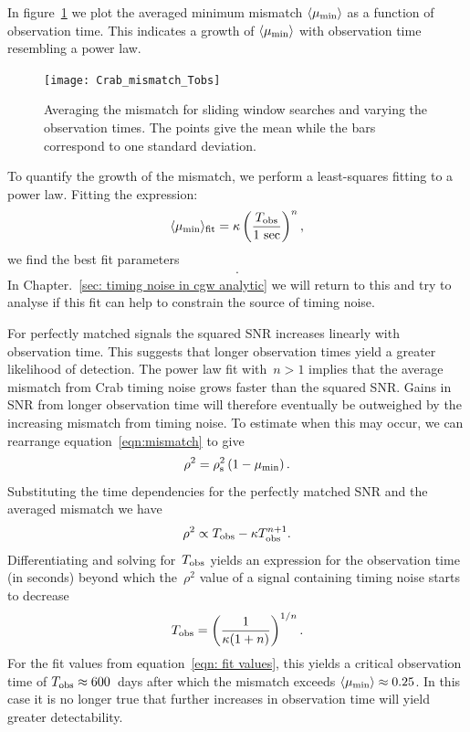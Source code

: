 \documentclass[../full_thesis/full_thesis.tex]{subfiles}
\newcommand{\thisdir}{../timing_noise_in_CGW}
\begin{document}
In figure~\ref{fig: mismatch Tobs} we plot the averaged minimum
mismatch $\langle\mu_{\mathrm{min}}\rangle$ as a function of observation time.
This indicates a growth of $\langle\mu_{\mathrm{min}}\rangle$ with observation time
resembling a power law.
\begin{figure}[ht]
\centering
\texttt{[image: Crab\_mismatch\_Tobs]}
\caption{Averaging the mismatch for sliding window searches and varying the
observation times. The points give the mean while the bars correspond to one
standard deviation.}
\label{fig: mismatch Tobs}
\end{figure}

To quantify the growth of the mismatch, we perform a least-squares fitting
to a power law. Fitting the expression:
\begin{equation}
\langle\mu_{\mathrm{min}}\rangle_{\textrm{fit}} = \kappa
                                   \left(\frac{T_{\textrm{obs}}}{1\textrm{ sec}}\right)^{n},
\end{equation}
we find the best fit parameters
\begin{align}
    .
    \label{eqn: fit values}
\end{align}
In Chapter.~\ref{sec: timing noise in cgw analytic} we will return to this
and try to analyse if this fit can help to constrain the source of timing noise.

For perfectly matched signals the squared SNR
increases linearly \citep{Prix2009} with observation time.
This suggests that longer observation
times yield a greater likelihood of detection. The power law fit with~$n > 1$
implies that the average mismatch from
Crab timing noise grows faster than the squared SNR.
Gains in
SNR from longer observation time will therefore eventually be
outweighed by the increasing mismatch from timing noise.
To estimate when this may occur, we can rearrange equation~\eqref{eqn:mismatch}
to give
\begin{equation}
    \rho^{2} = \rho^{2}_{\mathrm{s}}\left(1 - \mu_{\mathrm{min}}\right).
\end{equation}
Substituting the time dependencies for the perfectly matched SNR and the
averaged mismatch we have
\begin{equation}
    \rho^{2} \propto T_{\textrm{obs}} - \kappa T_{\textrm{obs}}^{n+1}.
\end{equation}
Differentiating and solving for~$T_{\textrm{obs}}$ yields an expression for the
observation time (in seconds)
beyond which the~$\rho^{2}$ value of a signal containing timing
noise starts to decrease
\begin{equation}
T_{\textrm{obs}} = \left(\frac{1}{\kappa(1+n)}\right)^{1/n}.
\end{equation}
For the fit values from equation~\eqref{eqn: fit values}, this yields
a critical observation time of
$T_{\textrm{obs}}\approx 600$~days after which the mismatch exceeds
$\langle\mu_{\mathrm{min}}\rangle \approx 0.25$.
In this case it is no longer true that further increases in
observation time will yield greater detectability.
\end{document}
